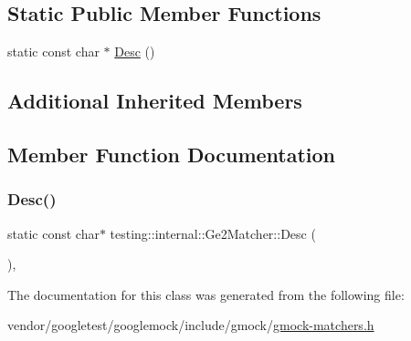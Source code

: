 \subsection*{Static Public Member Functions}
\begin{DoxyCompactItemize}
\item 
static const char $\ast$ \hyperlink{classtesting_1_1internal_1_1_ge2_matcher_a29fa53bdfa6778b709eaef017aeea855}{Desc} ()
\end{DoxyCompactItemize}
\subsection*{Additional Inherited Members}


\subsection{Member Function Documentation}
\mbox{\label{classtesting_1_1internal_1_1_ge2_matcher_a29fa53bdfa6778b709eaef017aeea855}} 
\subsubsection{\texorpdfstring{Desc()}{Desc()}}
{\footnotesize\ttfamily static const char$\ast$ testing\+::internal\+::\+Ge2\+Matcher\+::\+Desc (\begin{DoxyParamCaption}{ }\end{DoxyParamCaption})\hspace{0.3cm}{\ttfamily [inline]}, {\ttfamily [static]}}



The documentation for this class was generated from the following file\+:\begin{DoxyCompactItemize}
\item 
vendor/googletest/googlemock/include/gmock/\hyperlink{gmock-matchers_8h}{gmock-\/matchers.\+h}\end{DoxyCompactItemize}
